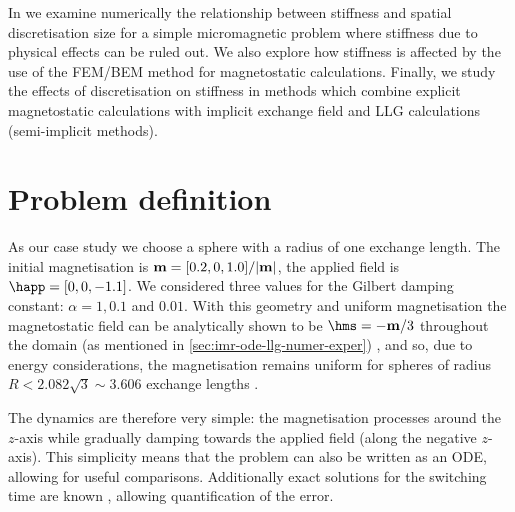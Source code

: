 In  we examine numerically the relationship between stiffness and spatial discretisation size for a simple micromagnetic problem where stiffness due to physical effects can be ruled out.
We also explore how stiffness is affected by the use of the FEM/BEM method for magnetostatic calculations.
Finally, we study the effects of discretisation on stiffness in methods which combine explicit magnetostatic calculations with implicit exchange field and LLG calculations (\ie semi-implicit methods).


\section{Problem definition}

As our case study we choose a sphere with a radius of one exchange length.
The initial magnetisation is $\boldsymbol{\mathrm{m}} = [0.2, 0, 1.0]/|\boldsymbol{\mathrm{m}}|$, the applied field is $\happ =[0, 0, -1.1]$.
We considered three values for the Gilbert damping constant: $\alpha = 1, 0.1$ and $0.01$.
With this geometry and uniform magnetisation the magnetostatic field can be analytically shown to be $\hms = -\mv/3$ throughout the domain (as mentioned in \cref{sec:imr-ode-llg-numer-exper}) \cite[112]{Aharoni1996}, and so, due to energy considerations, the magnetisation remains uniform for spheres of radius $R < 2.082 \sqrt{3} \sim 3.606$ exchange lengths \cite[211]{HubertSchafer}.

The dynamics are therefore very simple: the magnetisation processes around the $z$-axis while gradually damping towards the applied field (along the negative $z$-axis).
This simplicity means that the problem can also be written as an ODE, allowing for useful comparisons.
Additionally exact solutions for the switching time are known \cite{Mallinson2000}, allowing quantification of the error.



